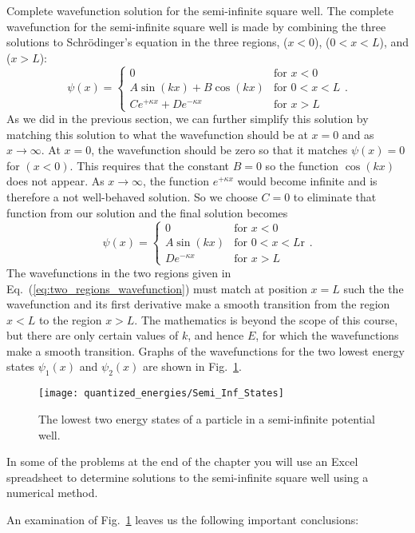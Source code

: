 \begin{exampleb}{Complete wavefunction solution for the semi-infinite square well.}
\label{ex:SolutionSemiInf}
The complete wavefunction for the semi-infinite square well is made
by combining the three solutions to Schr\"odinger's equation in the
three regions, ($x<0$), ($0 <x < L$), and ($ x > L$):
\begin{equation}
\psi(x) =  \left\{\begin{array}{ll} 
              0                       & \mbox{for $x<0$}  \\
              A \sin(kx) + B \cos(kx) & \mbox{for $0<x<L$} \\ 
              C e^{+\kappa x} + D e^{- \kappa x} & \mbox{for $x > L$} 
              \end{array} \right.  .
\end{equation}
As we did in the previous section, we can further simplify this
solution by matching this solution to what the wavefunction should be
at $x = 0$ and as $x \rightarrow \infty$. At $x = 0$, the wavefunction
should be zero so that it matches $\psi(x)=0$ for $(x < 0)$.  This
requires that the constant $B = 0$ so the function $\cos{(kx)}$ does
not appear.  As $x \rightarrow \infty$, the function $e^{+ \kappa x}$
would become infinite and is therefore a not well-behaved solution.
So we choose $C = 0$ to eliminate that function from our solution and
the final solution becomes
\begin{equation}
\label{eq:two_regions_wavefunction}
\psi(x) =  \left\{\begin{array}{ll} 
            0                & \mbox{for $x<0$} \\
            A \sin(kx)       &  \mbox{for $0 < x < L$r} \\  
            D e^{- \kappa x} & \mbox{for $x > L$}
            \end{array} \right. .
\end{equation}
The wavefunctions in the two regions given in
Eq.~(\ref{eq:two_regions_wavefunction}) must match at position $x =
L$ such the the wavefunction and its first derivative make a smooth
transition from the region $x<L$ to the region $x>L$.  The mathematics
is beyond the scope of this course, but there are only certain values
of $k$, and hence $E$, for which the wavefunctions make a smooth
transition. Graphs of the wavefunctions for the two lowest energy states
$\psi_1(x)$ and $\psi_2(x)$ are shown in Fig.~\ref{fig:Semi_Inf_States}.

\begin{figure}
\begin{center}
\texttt{[image: quantized\_energies/Semi\_Inf\_States]}
\end{center}
\caption{The lowest two energy states of a particle in a semi-infinite
  potential well.}
\label{fig:Semi_Inf_States}
\end{figure}
In some of the problems at the end of the chapter you will use an Excel 
spreadsheet to determine solutions to the semi-infinite square well using 
a numerical method.
\end{exampleb}
An examination of Fig.~\ref{fig:Semi_Inf_States} leaves us the
following important conclusions:

